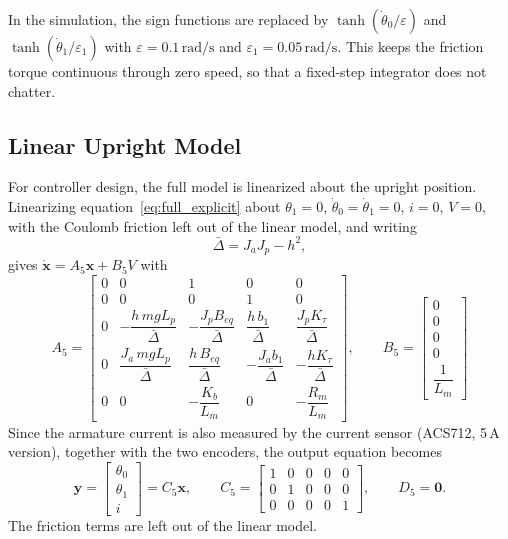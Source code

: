 \documentclass[a4paper,11pt]{article}
\begin{document}
In the simulation, the sign functions are replaced by $\tanh(\dot\theta_0/\varepsilon)$ and $\tanh(\dot\theta_1/\varepsilon_1)$ with $\varepsilon = 0.1\,\mathrm{rad/s}$ and $\varepsilon_1 = 0.05\,\mathrm{rad/s}$. This keeps the friction torque continuous through zero speed, so that a fixed-step integrator does not chatter.

\subsection{Linear Upright Model}
For controller design, the full model is linearized about the upright position. Linearizing equation~\ref{eq:full_explicit} about $\theta_1 = 0$, $\dot\theta_0 = \dot\theta_1 = 0$, $i = 0$, $V = 0$, with the Coulomb friction left out of the linear model, and writing
\begin{equation}
  \bar\Delta = J_a J_p - h^2 ,
\end{equation}
gives $\dot{\mathbf{x}} = A_5 \mathbf{x} + B_5 V$ with
\begin{equation}
\boxed{
A_5 = \begin{bmatrix}
0 & 0 & 1 & 0 & 0\\
0 & 0 & 0 & 1 & 0\\[2pt]
0 & -\dfrac{h\, m g L_p}{\bar\Delta} & -\dfrac{J_p B_{eq}}{\bar\Delta} & \dfrac{h\, b_1}{\bar\Delta} & \dfrac{J_p K_\tau}{\bar\Delta}\\[8pt]
0 & \dfrac{J_a\, m g L_p}{\bar\Delta} & \dfrac{h\, B_{eq}}{\bar\Delta} & -\dfrac{J_a b_1}{\bar\Delta} & -\dfrac{h K_\tau}{\bar\Delta}\\[8pt]
0 & 0 & -\dfrac{K_b}{L_m} & 0 & -\dfrac{R_m}{L_m}
\end{bmatrix},
\qquad
B_5 = \begin{bmatrix} 0 \\ 0 \\ 0 \\ 0 \\ \dfrac{1}{L_m} \end{bmatrix}
}
\label{eq:ss5}
\end{equation}
Since the armature current is also measured by the current sensor (ACS712, 5\,A version), together with the two encoders, the output equation becomes
\begin{equation}
  \mathbf{y} = \begin{bmatrix} \theta_0 \\ \theta_1 \\ i \end{bmatrix} = C_5 \mathbf{x}, \qquad
  C_5 = \begin{bmatrix} 1 & 0 & 0 & 0 & 0 \\ 0 & 1 & 0 & 0 & 0 \\ 0 & 0 & 0 & 0 & 1 \end{bmatrix}, \qquad
  D_5 = \mathbf{0} .
\end{equation}
The friction terms are left out of the linear model.
\end{document}
